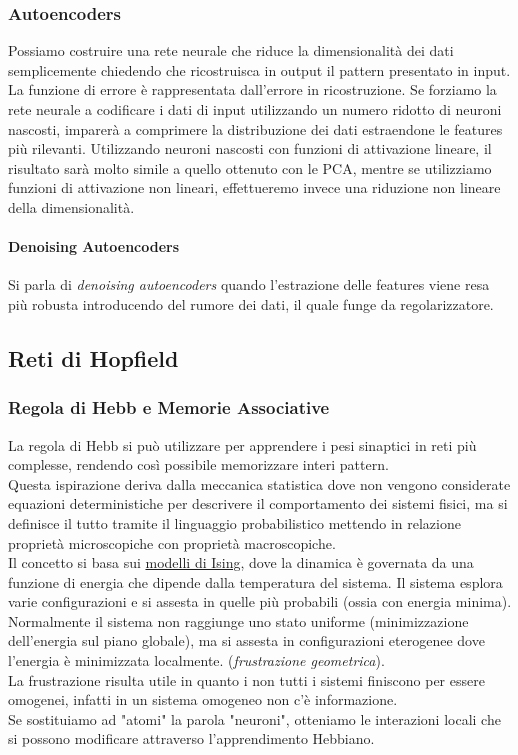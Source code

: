 \subsubsection{Autoencoders}
Possiamo costruire una rete neurale che riduce la dimensionalità dei dati semplicemente chiedendo che ricostruisca in output il pattern presentato in input. La funzione di errore è rappresentata dall'errore in ricostruzione.
Se forziamo la rete neurale a codificare i dati di input utilizzando un numero ridotto di neuroni nascosti, imparerà a comprimere la distribuzione dei dati estraendone le features più rilevanti.
Utilizzando neuroni nascosti con funzioni di attivazione lineare, il risultato sarà molto simile a quello ottenuto con le PCA, mentre se utilizziamo funzioni di attivazione non lineari, effettueremo invece una riduzione non lineare della dimensionalità.

\paragraph{Denoising Autoencoders} Si parla di \textit{denoising autoencoders} quando l'estrazione delle features viene resa più robusta introducendo del rumore dei dati, il quale funge da regolarizzatore.

\subsection{Reti di Hopfield}
\subsubsection{Regola di Hebb e Memorie Associative}
La regola di Hebb si può utilizzare per apprendere i pesi sinaptici in reti più complesse, rendendo così possibile memorizzare interi pattern. \\
Questa ispirazione deriva dalla meccanica statistica dove non vengono considerate equazioni deterministiche per descrivere il comportamento dei sistemi fisici, ma si definisce il tutto tramite il linguaggio probabilistico mettendo in relazione proprietà microscopiche con proprietà macroscopiche. \\
Il concetto si basa sui \href{https://it.wikipedia.org/wiki/Modello_di_Ising}{modelli di Ising}, dove la dinamica è governata da una funzione di energia che dipende dalla temperatura del sistema. Il sistema esplora varie configurazioni e si assesta in quelle più probabili (ossia con energia minima). Normalmente il sistema non raggiunge uno stato uniforme (minimizzazione dell'energia sul piano globale), ma si assesta in configurazioni eterogenee dove l'energia è minimizzata localmente. (\textit{frustrazione geometrica}). \\
La frustrazione risulta utile in quanto i non tutti i sistemi finiscono per essere omogenei, infatti in un sistema omogeneo non c'è informazione. \\
Se sostituiamo ad "atomi" la parola "neuroni", otteniamo le interazioni locali che si possono modificare attraverso l'apprendimento Hebbiano.

